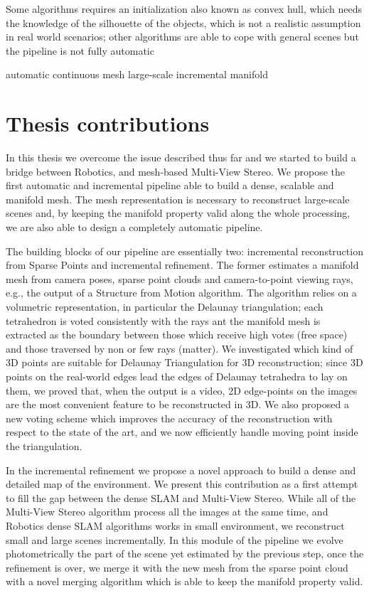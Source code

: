 Some algorithms requires an initialization also known as convex hull, which needs the knowledge of the silhouette of the objects, which  is not a realistic assumption in real world scenarios; other algorithms are able to cope with general scenes but the pipeline is not fully automatic






automatic
continuous mesh
large-scale
incremental
manifold





\section{Thesis contributions}
In this thesis we overcome the issue described thus far and we started to build a bridge between Robotics, and mesh-based Multi-View Stereo.
We propose the first automatic and incremental pipeline able to build a dense, scalable and manifold mesh.
The mesh representation is necessary to reconstruct  large-scale scenes and, by keeping the manifold property valid along the whole processing, we are also able to design a completely automatic pipeline.

The building blocks of our pipeline are essentially two: incremental reconstruction from Sparse Points and incremental refinement.
The former estimates a  manifold mesh from camera poses, sparse point clouds and camera-to-point viewing rays, e.g., the output of a Structure from Motion algorithm.
The algorithm relies on a volumetric representation, in particular the Delaunay triangulation; each tetrahedron is voted consistently with the rays ant the manifold mesh is extracted as the boundary between those which receive high votes (free space) and those traversed by non or few rays (matter).
We investigated which kind of 3D points are suitable for Delaunay Triangulation for 3D reconstruction; since 3D points on the real-world edges lead the edges of Delaunay tetrahedra to lay on them, we proved that, when the output is a video, 2D edge-points on the images are the most convenient feature to be reconstructed in 3D.
We also proposed a new voting scheme which improves the accuracy of the reconstruction with respect to the state of the art, and we now efficiently handle moving point inside the triangulation.

In the incremental refinement we propose a novel approach to build a dense and detailed map of the environment. 
We present this contribution as a first attempt to fill the gap between the dense SLAM and Multi-View Stereo.
While all of the Multi-View Stereo algorithm process all the images  at the same time, and Robotics dense SLAM algorithms works in small environment, we reconstruct small and large scenes incrementally. 
In this module of the pipeline we evolve photometrically the part of the scene yet estimated by the previous step, once the refinement is over, we merge it with the new mesh from the sparse point cloud with a novel merging algorithm which is able to keep the manifold property valid.

